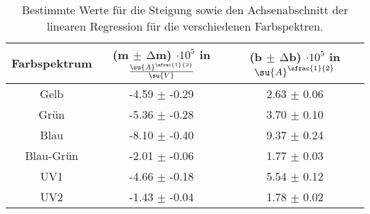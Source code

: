 \begin{table}
  \centering
  \caption{Bestimmte Werte für die Steigung sowie den Achsenabschnitt der
           linearen Regression für die verschiedenen Farbspektren.}
  \label{tab:Messparameter}
  \begin{tabular}{c | c c}
    \toprule
    Farbspektrum & (m $\pm$ $\increment$m) $\cdot 10^5$ in $\frac{\su{A}^{\sfrac{1}{2}}}{\su{V}}$ &
    (b $\pm$ $\increment$b) $\cdot 10^5$ in $\su{A}^{\sfrac{1}{2}}$ \\
    \midrule
    Gelb      & -4.59 $\pm$ -0.29 & 2.63 $\pm$ 0.06 \\
    Grün      & -5.36 $\pm$ -0.28 & 3.70 $\pm$ 0.10 \\
    Blau      & -8.10 $\pm$ -0.40 & 9.37 $\pm$ 0.24 \\
    Blau-Grün & -2.01 $\pm$ -0.06 & 1.77 $\pm$ 0.03 \\
    UV1       & -4.66 $\pm$ -0.18 & 5.54 $\pm$ 0.12 \\
    UV2       & -1.43 $\pm$ -0.04 & 1.78 $\pm$ 0.02 \\
    \bottomrule
  \end{tabular}
\end{table}
